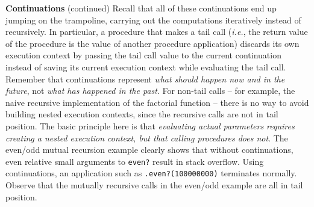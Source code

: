 \begin{minipage}[t]{\sw}
\slidenumber
\LARGE
{\bf Continuations} (continued)\exx
Recall that all of these continuations end up
jumping on the trampoline,
carrying out the computations
iteratively instead of recursively.
In particular,
a procedure that makes a tail call
({\em i.e.}, the return value of the procedure
is the value of another procedure application)
discards its own execution context
by passing the tail call value
to the current continuation
instead of saving its current execution context
while evaluating the tail call.
Remember that continuations represent
{\em what should happen now and in the future},
not {\em what has happened in the past}.\exx
For non-tail calls --
for example, the naive recursive implementation
of the factorial function --
there is no way to avoid building nested execution contexts,
since the recursive calls are not in tail position.
The basic principle here is that
{\em evaluating actual parameters
requires creating a nested execution context,
but that calling procedures does not}.\exx
The even/odd mutual recursion example clearly shows
that without continuations,
even relative small arguments to \verb'even?' result
in stack overflow.
Using continuations,
an application such as \verb'.even?(100000000)'
terminates normally.
Observe that the mutually recursive calls
in the even/odd example are all in tail position.
\end{minipage}
